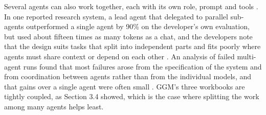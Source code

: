 Several agents can also work together, each with its own role, prompt and tools \citep{guo2024llm}.
In one reported research system, a lead agent that delegated to parallel sub-agents outperformed a single agent by 90\% on the developer's own evaluation, but used about fifteen times as many tokens as a chat, and the developers note that the design suits tasks that split into independent parts and fits poorly where agents must share context or depend on each other \citep{anthropic2025we}.
An analysis of failed multi-agent runs found that most failures arose from the specification of the system and from coordination between agents rather than from the individual models, and that gains over a single agent were often small \citep{cemri2025multi}.
GGM's three workbooks are tightly coupled, as Section 3.4 showed, which is the case where splitting the work among many agents helps least.
